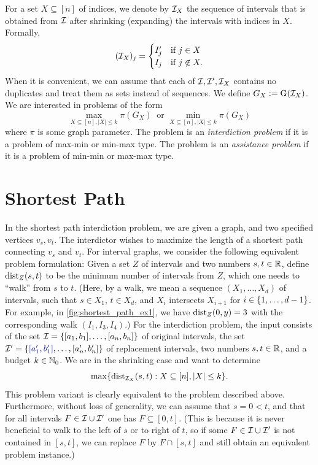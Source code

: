 For a set $X \subseteq [n]$ of indices, we denote by $\mathcal{I}_X$ the sequence of intervals that is obtained from  $\mathcal{I}$ after shrinking (expanding) the intervals with indices in $X$. Formally, 
\[(\mathcal{I}_X)_j = \begin{cases} I'_j & \text{if }j \in X \\
I_j & \text{if } j \not\in X. \end{cases}\]
When it is convenient, we can assume that each of $\mathcal{I}, \mathcal{I}', \mathcal{I}_X$ contains no duplicates and treat them as sets instead of sequences. We define $G_X := \operatorname{G}(\mathcal{I}_X)$. We are interested in problems of the form 
\[ \max_{X \subseteq [n], |X| \leq k} \pi(G_X) \ \text{ or } \min_{X \subseteq [n], |X| \leq k} \pi(G_X)\]
where $\pi$ is some graph parameter. The problem is an \emph{interdiction problem} if it is a problem of max-min or min-max type. The problem is an \emph{assistance problem} if it is a problem of min-min or max-max type.

\section{Shortest Path}

In the shortest path interdiction problem, we are given a graph, and two specified vertices $v_s, v_t$. The interdictor wishes to maximize the length of a shortest path connecting $v_s$ and $v_t$. For interval graphs, we consider the following equivalent problem formulation: 
Given a set $Z$ of intervals and two numbers $s, t \in \mathbb{R}$, define $\operatorname{\text{dist}}_Z(s, t)$ to be the minimum number of intervals from $Z$, which one needs to \enquote{walk} from $s$ to $t$. (Here, by a walk, we mean a sequence $(X_1, \dots, X_d)$ of intervals, such that $s \in X_1$, $t \in X_d$, and $X_i$ intersects $X_{i+1}$ for $i \in \{ 1, \ldots, d-1 \}$. For example, in \cref{fig:shortest_path_ex1}, we have $\operatorname{\text{dist}}_Z(0, y) = 3$ with the corresponding walk $(I_1,I_3,I_4)$.) 
For the interdiction problem, 
the input consists of the set $\mathcal{I} = \{ [a_1,b_1], \dots, [a_n, b_n] \}$ of original intervals, the set 
$\mathcal{I}' = \{ \textcolor{blue}{[a'_1,b'_1]}, \dots, [a'_n, b'_n] \}$ of replacement intervals, two numbers $s, t \in \mathbb{R}$, and a budget $k \in \mathbb{N}_0$. We are in the shrinking case and want to determine 
\[\max\{ \operatorname{\text{dist}}_{\mathcal{I}_X}(s, t) : X \subseteq [n], |X| \leq k \}.\] This problem variant is clearly equivalent to the problem described above. Furthermore, without loss of generality, we can assume that $s = 0 < t$, and that for all intervals $F \in \mathcal{I} \cup \mathcal{I}'$ one has $F \subseteq [0, t]$. (This is because it is never beneficial to walk to the left of $s$ or to right of $t$, so if some $F \in \mathcal{I} \cup \mathcal{I}'$ is not contained in $[s, t]$, we can replace $F$ by $F \cap [s, t]$ and still obtain an equivalent problem instance.) 

